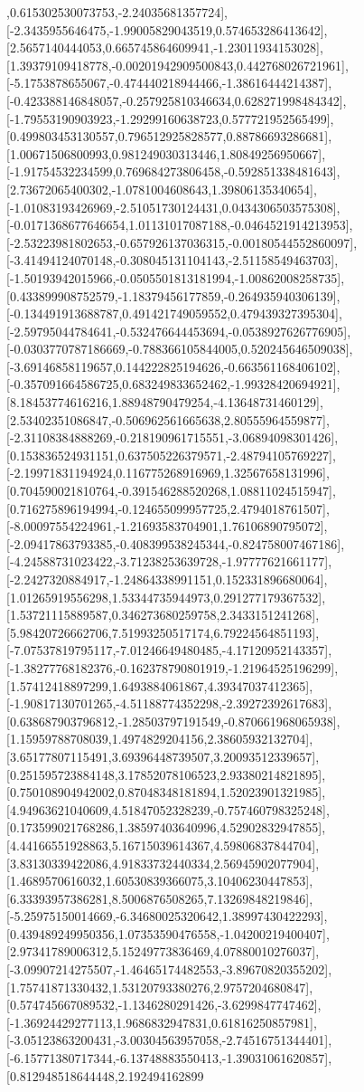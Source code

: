 \documentclass{article}
\begin{document}
,0.615302530073753,-2.24035681357724],[-2.3435955646475,-1.99005829043519,0.574653286413642],[2.5657140444053,0.665745864609941,-1.23011934153028],[1.39379109418778,-0.00201942909500843,0.442768026721961],[-5.1753878655067,-0.474440218944466,-1.38616444214387],[-0.423388146848057,-0.257925810346634,0.628271998484342],[-1.79553190903923,-1.29299160638723,0.577721952565499],[0.499803453130557,0.796512925828577,0.88786693286681],[1.00671506800993,0.981249030313446,1.80849256950667],[-1.91754532234599,0.769684273806458,-0.592851338481643],[2.73672065400302,-1.0781004608643,1.39806135340654],[-1.01083193426969,-2.51051730124431,0.0434306503575308],[-0.0171368677646654,1.01131017087188,-0.0464521914213953],[-2.53223981802653,-0.657926137036315,-0.00180544552860097],[-3.41494124070148,-0.308045131104143,-2.51158549463703],[-1.50193942015966,-0.0505501813181994,-1.00862008258735],[0.433899908752579,-1.18379456177859,-0.264935940306139],[-0.134491913688787,0.491421749059552,0.479439327395304],[-2.59795044784641,-0.532476644453694,-0.0538927626776905],[-0.0303770787186669,-0.788366105844005,0.520245646509038],[-3.69146858119657,0.144222825194626,-0.663561168406102],[-0.357091664586725,0.683249833652462,-1.99328420694921],[8.18453774616216,1.88948790479254,-4.13648731460129],[2.53402351086847,-0.506962561665638,2.80555964559877],[-2.31108384888269,-0.218190961715551,-3.06894098301426],[0.153836524931151,0.637505226379571,-2.48794105769227],[-2.19971831194924,0.116775268916969,1.32567658131996],[0.704590021810764,-0.391546288520268,1.08811024515947],[0.716275896194994,-0.124655099957725,2.4794018761507],[-8.00097554224961,-1.21693583704901,1.76106890795072],[-2.09417863793385,-0.408399538245344,-0.824758007467186],[-4.24588731023422,-3.71238253639728,-1.97777621661177],[-2.2427320884917,-1.24864338991151,0.152331896680064],[1.01265919556298,1.53344735944973,0.291277179367532],[1.53721115889587,0.346273680259758,2.3433151241268],[5.98420726662706,7.51993250517174,6.79224564851193],[-7.07537819795117,-7.01246649480485,-4.17120952143357],[-1.38277768182376,-0.162378790801919,-1.21964525196299],[1.57412418897299,1.6493884061867,4.39347037412365],[-1.90817130701265,-4.51188774352298,-2.39272392617683],[0.638687903796812,-1.28503797191549,-0.870661968065938],[1.15959788708039,1.4974829204156,2.38605932132704],[3.65177807115491,3.69396448739507,3.20093512339657],[0.251595723884148,3.17852078106523,2.93380214821895],[0.750108904942002,0.87048348181894,1.52023901321985],[4.94963621040609,4.51847052328239,-0.757460798325248],[0.173599021768286,1.38597403640996,4.52902832947855],[4.44166551928863,5.16715039614367,4.59806837844704],[3.83130339422086,4.91833732440334,2.56945902077904],[1.4689570616032,1.60530839366075,3.10406230447853],[6.33393957386281,8.5006876508265,7.13269848219846],[-5.25975150014669,-6.34680025320642,1.38997430422293],[0.439489249950356,1.07353590476558,-1.04200219400407],[2.97341789006312,5.15249773836469,4.07880010276037],[-3.09907214275507,-1.46465174482553,-3.89670820355202],[1.75741871330432,1.53120793380276,2.9757204680847],[0.574745667089532,-1.1346280291426,-3.6299847747462],[-1.36924429277113,1.9686832947831,0.61816250857981],[-3.05123863200431,-3.00304563957058,-2.74516751344401],[-6.15771380717344,-6.13748883550413,-1.39031061620857],[0.812948518644448,2.192494162899
\end{document}
